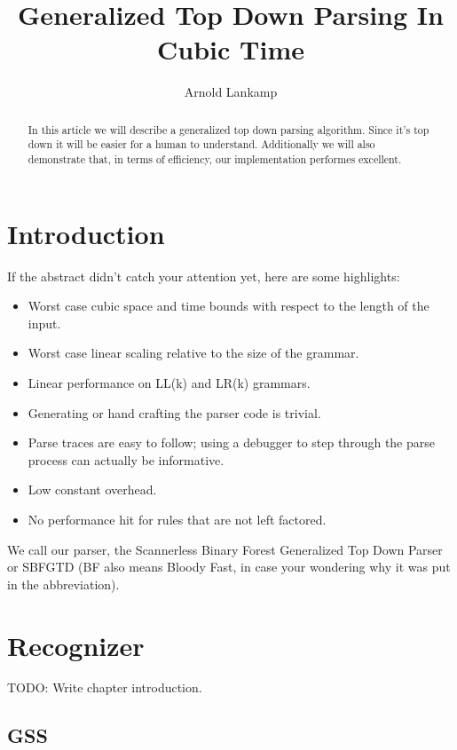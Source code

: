 \documentclass[a4paper,10pt]{article}
\title{Generalized Top Down Parsing In Cubic Time}
\author{Arnold Lankamp}
\begin{document}
\maketitle

\begin{abstract}

In this article we will describe a generalized top down parsing algorithm. Since it's top down it will be easier for a human to understand. Additionally we will also demonstrate that, in terms of efficiency, our implementation performes excellent.

\end{abstract}

\section{Introduction}

If the abstract didn't catch your attention yet, here are some highlights:
\begin{itemize}
 \setlength{\itemsep}{0pt}
 \setlength{\parskip}{0pt}
 \setlength{\parsep}{0pt}

 \item Worst case cubic space and time bounds with respect to the length of the input.
 \item Worst case linear scaling relative to the size of the grammar.
 \item Linear performance on LL(k) and LR(k) grammars.
 \item Generating or hand crafting the parser code is trivial.
 \item Parse traces are easy to follow; using a debugger to step through the parse process can actually be informative.
 \item Low constant overhead.
 \item No performance hit for rules that are not left factored.
\end{itemize}
We call our parser, the Scannerless Binary Forest Generalized Top Down Parser or SBFGTD (BF also means Bloody Fast, in case your wondering why it was put in the abbreviation).

\section{Recognizer}

TODO: Write chapter introduction.

\subsection{GSS}
\end{document}
